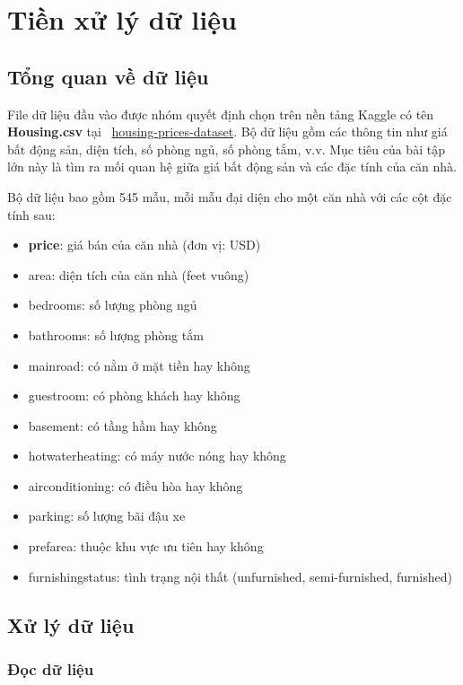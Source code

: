 \section{Tiền xử lý dữ liệu}
\subsection{Tổng quan về dữ liệu}

\hspace{10pt}
File dữ liệu đầu vào được nhóm quyết định chọn trên nền tảng Kaggle có tên \textbf{Housing.csv} tại 
\href{https://www.kaggle.com/datasets/yasserh/housing-prices-dataset}{housing-prices-dataset}. Bộ dữ liệu gồm các thông tin như giá bất động sản, diện tích, số phòng ngủ, số phòng tắm, v.v. Mục tiêu của bài tập lớn này là tìm ra mối quan hệ giữa giá bất động sản và các đặc tính của căn nhà.\\
\hspace{10pt}

Bộ dữ liệu bao gồm 545 mẫu, mỗi mẫu đại diện cho một căn nhà với các cột đặc tính sau:
\begin{itemize}
	\item \textbf{price}: giá bán của căn nhà (đơn vị: USD)
	\item area: diện tích của căn nhà (feet vuông)
	\item bedrooms: số lượng phòng ngủ
	\item bathrooms: số lượng phòng tắm
	\item mainroad: có nằm ở mặt tiền hay không
	\item guestroom: có phòng khách hay không
	\item basement: có tầng hầm hay không
	\item hotwaterheating: có máy nước nóng hay không
	\item airconditioning: có điều hòa hay không
	\item parking: số lượng bãi đậu xe
	\item prefarea: thuộc khu vực ưu tiên hay không
	\item furnishingstatus: tình trạng nội thất (unfurnished, semi-furnished, furnished)
\end{itemize}

\subsection{Xử lý dữ liệu}

\subsubsection{Đọc dữ liệu}


